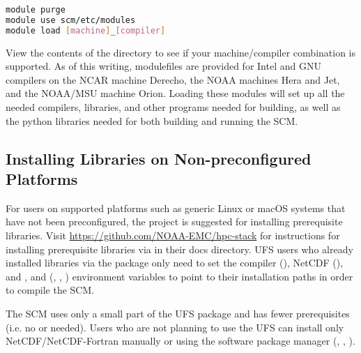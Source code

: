 \begin{lstlisting}[language=sh]
module purge
module use scm/etc/modules
module load [machine]_[compiler]
\end{lstlisting}

View the contents of the  directory to see if your machine/compiler combination is supported. As of this writing, modulefiles are provided for Intel and GNU compilers on the NCAR machine Derecho, the NOAA machines Hera and Jet, and the NOAA/MSU machine Orion. Loading these modules will set up all the needed compilers, libraries, and other programs needed for building, as well as the python libraries needed for both building and running the SCM.

\subsection{Installing Libraries on Non-preconfigured Platforms}\label{section: setup_supported_platforms}
For users on supported platforms such as generic Linux or macOS systems that have not been preconfigured, the  project is suggested for installing prerequisite libraries. Visit \url{https://github.com/NOAA-EMC/hpc-stack} for instructions for installing prerequisite libraries via  in their docs directory. UFS users who already installed libraries via the  package only need to set the compiler (), NetCDF (), and ,   and  (, , ) environment variables to point to their installation paths in order to compile the SCM. 

The SCM uses only a small part of the UFS  package and has fewer prerequisites (i.e. no  or  needed). Users who are not planning to use the UFS can install only NetCDF/NetCDF-Fortran manually or using the software package manager (, , ).

